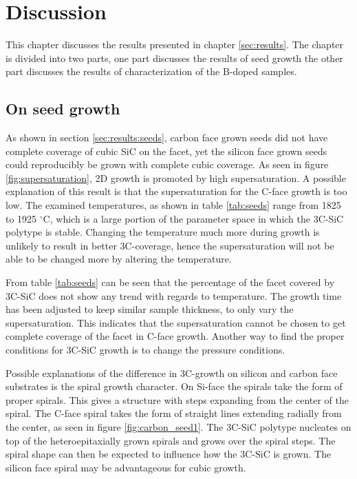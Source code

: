 
\chapter{Discussion}
\label{sec:discussion}
This chapter discusses the results presented in chapter \ref{sec:results}. The chapter is divided into two parts, one part discusses the results of seed growth the other part discusses the results of characterization of the B-doped samples. 

\section{On seed growth}
As shown in section \ref{sec:results:seeds}, carbon face grown seeds did not have complete coverage of cubic SiC on the facet, yet the silicon face grown seeds could reproducibly be grown with complete cubic coverage. As seen in figure \ref{fig:supersaturation}, 2D growth is promoted by high supersaturation. A possible explanation of this result is that the supersaturation for the C-face growth is too low. The examined temperatures, as shown in table \ref{tab:seeds}  range from 1825 to 1925 $^\circ$C, which is a large portion of the parameter space in which the 3C-SiC polytype is stable. Changing the temperature much more during growth is unlikely to result in better 3C-coverage, hence the supersaturation will not be able to be changed more by altering the temperature. 

From table \ref{tab:seeds} can be seen that the percentage of the facet covered by 3C-SiC does not show any trend with regards to temperature. The growth time has been adjusted to keep similar sample thickness, to only vary the supersaturation. This indicates that the supersaturation cannot be chosen to get complete coverage of the facet in C-face growth. Another way to find the proper conditions for 3C-SiC growth is to change the pressure conditions. 

Possible explanations of the difference in 3C-growth on silicon and carbon face substrates is the spiral growth character. On Si-face the spirals take the form of proper spirals. This gives a structure with steps expanding from the center of the spiral. The C-face spiral takes the form of straight lines extending radially from the center, as seen in figure \ref{fig:carbon_seed1}. The 3C-SiC polytype nucleates on top of the heteroepitaxially grown spirals and grows over the spiral steps. The spiral shape can then be expected to influence how the 3C-SiC is grown. The silicon face spiral may be advantageous for cubic growth. 

